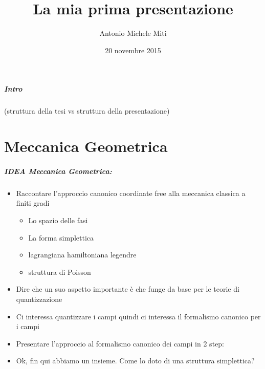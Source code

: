\documentclass{beamer}
\title{La mia prima presentazione}
\author{Antonio Michele Miti}
\date{20 novembre 2015}
\begin{document}
	\begin{frame} %
		\maketitle
	\end{frame}
	
	\begin{frame} %
		\frametitle{Intro}
		(struttura della tesi vs struttura della presentazione)
	\end{frame}
	

	\part{Meccanica Geometrica}
		\frame{\partpage}
	
		\begin{frame}
		\frametitle{IDEA Meccanica Geometrica:}
			\begin{itemize}
				\item<1-> Raccontare l'approccio canonico coordinate free alla meccanica classica a finiti gradi
					\begin{itemize}
						\item Lo spazio delle fasi
						\item La forma simplettica
						\item lagrangiana hamiltoniana legendre
						\item struttura di Poisson
					\end{itemize}
				\item<1-> Dire che un suo aspetto importante è che funge da base per le teorie di quantizzazione
				\item<1-> Ci interessa quantizzare i campi quindi ci interessa il formalismo canonico per i campi
				\item<2-> Presentare l'approccio al formalismo canonico dei campi in 2 step:
				\item<3-> Ok, fin qui abbiamo un insieme. Come lo doto di una struttura simplettica?
			\end{itemize}
	\end{frame}
	
\end{document}
